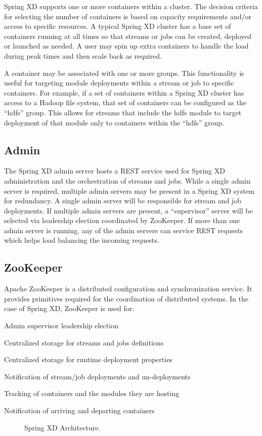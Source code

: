 Spring XD supports one or more containers within a cluster. The decision criteria
for selecting the number of containers is based on capacity requirements and/or access
to specific resources.  A typical Spring XD cluster has a base set of containers
running at all times so that streams or jobs can be created, deployed or launched
as needed. A user may spin up extra containers to handle the load during peak times
and then scale back as required.

A container may be associated with one or more groups. This functionality is useful
for targeting module deployments within a stream or job to specific containers.
For example, if a set of containers within a Spring XD cluster has access to
a Hadoop file system, that set of containers can be configured as the ``hdfs'' group.
This allows for streams that include the hdfs module to target deployment of
that module only to containers within the ``hdfs'' group.

\subsection{Admin}
\label{subsec:Admin}
The Spring XD admin server hosts a REST service used for Spring XD
administration and the orchestration of streams and jobs. While a single
admin server is required, multiple admin servers may be present in a Spring XD
system for redundancy. A single admin server will be responsible for stream
and job deployments. If multiple admin servers are present, a ``supervisor''
server will be selected via leadership election coordinated by ZooKeeper.
If more than one admin server is running, any of the admin servers
can service REST requests which helps load balancing the incoming requests.


\subsection{ZooKeeper}
Apache ZooKeeper is a distributed configuration and synchronization service.
It provides primitives required for the coordination of distributed systems.
In the case of Spring XD, ZooKeeper is used for: \begin{itemize*}
	\item Admin supervisor leadership election
	\item Centralized storage for streams and jobs definitions
	\item Centralized storage for runtime deployment properties
	\item Notification of stream/job deployments and un-deployments
	\item Tracking of containers and the modules they are hosting
	\item Notification of arriving and departing containers
\end{itemize*}
\begin{figure}[ht]
\centering
{}
\caption{Spring XD Architecture.}
\label{fig:architecture}
\end{figure}

